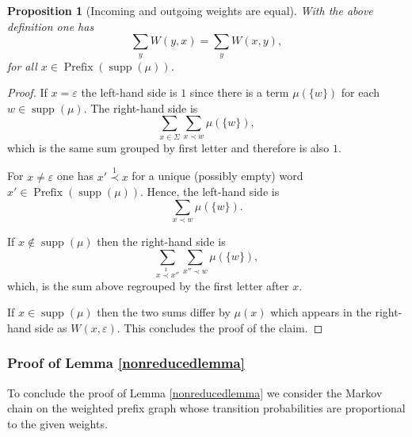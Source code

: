 \documentclass{article}
\newtheorem{proposition}{Proposition}
\DeclareMathOperator{\supp}{supp}
\DeclareMathOperator{\prefix}{Prefix}
\begin{document}
\begin{proposition}[Incoming and outgoing weights are equal]\label{flowproposition}
With the above definition one has
\[\sum\limits_{y}W(y,x) = \sum\limits_{y}W(x,y),\] 
for all \(x \in \prefix(\supp(\mu))\).
\end{proposition}
\begin{proof}
If \(x = \varepsilon\) the left-hand side is \(1\) since there is a term \(\mu(\lbrace w\rbrace)\) for each \(w \in \supp(\mu)\).   The right-hand side is
\[\sum\limits_{x \in \Sigma} \sum\limits_{x \prec w} \mu(\lbrace w\rbrace),\]
which is the same sum grouped by first letter and therefore is also \(1\).

For \(x \neq \varepsilon\) one has \(x' \overset{1}{\prec}x\) for a  unique (possibly empty) word \(x' \in \prefix(\supp(\mu))\).  Hence, the left-hand side is
\[\sum\limits_{x \prec w}\mu(\lbrace w\rbrace).\]

If \(x \notin \supp(\mu)\) then the right-hand side is
\[\sum\limits_{x \overset{1}{\prec}x''} \sum\limits_{x'' \prec w} \mu(\lbrace w\rbrace),\]
which, is the sum above regrouped by the first letter after \(x\).

If \(x \in \supp(\mu)\) then the two sums differ by \(\mu(x)\) which appears in the right-hand side as \(W(x,\varepsilon)\).  This concludes the proof of the claim.
\end{proof}

\subsubsection{Proof of Lemma \ref{nonreducedlemma}}

To conclude the proof of Lemma \ref{nonreducedlemma} we consider the Markov chain on the weighted prefix graph whose transition probabilities are proportional to the given weights.
\end{document}
